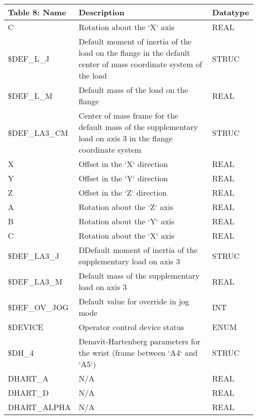 \begin{appendices}
        \newpage
        \begin{tabular}{|p{}|p{}|p{}|}
        \hline
        \textbf{Table 8: Name} & \textbf{Description} & \textbf{Datatype} \\ \hline
        \quad C & Rotation about the `X` axis & REAL \\ \hline
        \$DEF\_L\_J & Default moment of inertia of the load on the flange in the default center of mass coordinate system of the load & STRUC \\ \hline
        \$DEF\_L\_M & Default mass of the load on the flange & REAL \\ \hline
        \$DEF\_LA3\_CM & Center of mass frame for the default mass of the supplementary load on axis 3 in the flange coordinate system & STRUC \\ \hline
        \quad X & Offset in the `X` direction & REAL \\ \hline
        \quad Y & Offset in the `Y` direction & REAL \\ \hline
        \quad Z & Offset in the `Z` direction & REAL \\ \hline
        \quad A & Rotation about the `Z` axis & REAL \\ \hline
        \quad B & Rotation about the `Y` axis & REAL \\ \hline
        \quad C & Rotation about the `X` axis & REAL \\ \hline
        \$DEF\_LA3\_J & DDefault moment of inertia of the supplementary load on axis 3 & STRUC \\ \hline
        \$DEF\_LA3\_M & Default mass of the supplementary load on axis 3 & REAL \\ \hline
        \$DEF\_OV\_JOG & Default value for override in jog mode & INT \\ \hline
        \$DEVICE & Operator control device status & ENUM \\ \hline
        \$DH\_4 & Denavit-Hartenberg parameters for the wrist (frame between `A4` and `A5`) & STRUC \\ \hline
        \quad DHART\_A & N/A & REAL \\ \hline
        \quad DHART\_D & N/A & REAL \\ \hline
        \quad DHART\_ALPHA & N/A & REAL \\ \hline
        \end{tabular}
        

\end{appendices}
